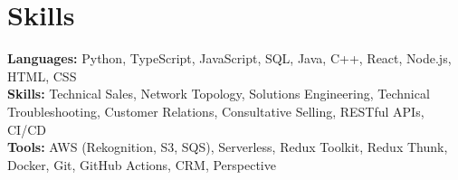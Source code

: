 \documentclass[11pt]{article}       %
\begin{document}

\vspace{-18.5pt}


\section*{Skills}
\textbf{Languages:} Python, TypeScript, JavaScript, SQL, Java, C++, React, Node.js, HTML, CSS\\
\textbf{Skills:} Technical Sales, Network Topology, Solutions Engineering, Technical Troubleshooting, Customer Relations, Consultative Selling, RESTful APIs, CI/CD\\
\textbf{Tools:} AWS (Rekognition, S3, SQS), Serverless, Redux Toolkit, Redux Thunk, Docker, Git, GitHub Actions, CRM, Perspective\\

\vspace{-6.5pt}
\end{document}
